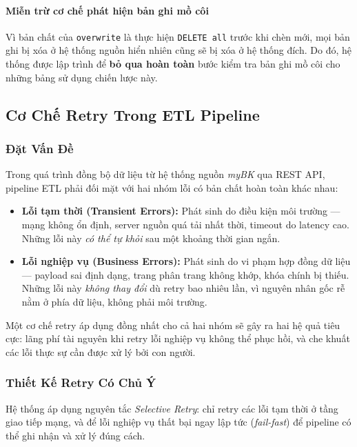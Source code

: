 \paragraph{Miễn trừ cơ chế phát hiện bản ghi mồ côi}

Vì bản chất của \texttt{overwrite} là thực hiện \texttt{DELETE all} trước khi chèn mới, mọi bản ghi bị xóa ở hệ thống nguồn hiển nhiên cũng sẽ bị xóa ở hệ thống đích. Do đó, hệ thống được lập trình để \textbf{bỏ qua hoàn toàn} bước kiểm tra bản ghi mồ côi cho những bảng sử dụng chiến lược này.

\newpage
\subsection{Cơ Chế Retry Trong ETL Pipeline}

\subsubsection{Đặt Vấn Đề}

Trong quá trình đồng bộ dữ liệu từ hệ thống nguồn \textit{myBK} qua REST API,
pipeline ETL phải đối mặt với hai nhóm lỗi có bản chất hoàn toàn khác nhau:

\begin{itemize}
    \item \textbf{Lỗi tạm thời (Transient Errors):} Phát sinh do điều kiện môi
    trường — mạng không ổn định, server nguồn quá tải nhất thời, timeout do
    latency cao. Những lỗi này \emph{có thể tự khỏi} sau một khoảng thời gian
    ngắn.

    \item \textbf{Lỗi nghiệp vụ (Business Errors):} Phát sinh do vi phạm hợp
    đồng dữ liệu — payload sai định dạng, trang phân trang không khớp, khóa
    chính bị thiếu. Những lỗi này \emph{không thay đổi} dù retry bao nhiêu lần,
    vì nguyên nhân gốc rễ nằm ở phía dữ liệu, không phải môi trường.
\end{itemize}

Một cơ chế retry áp dụng đồng nhất cho cả hai nhóm sẽ gây ra hai hệ quả tiêu
cực: lãng phí tài nguyên khi retry lỗi nghiệp vụ không thể phục hồi, và che
khuất các lỗi thực sự cần được xử lý bởi con người.

\subsubsection{Thiết Kế Retry Có Chủ Ý}

Hệ thống áp dụng nguyên tắc \textit{Selective Retry}: chỉ retry các lỗi tạm
thời ở tầng giao tiếp mạng, và để lỗi nghiệp vụ thất bại ngay lập tức
(\textit{fail-fast}) để pipeline có thể ghi nhận và xử lý đúng cách.


